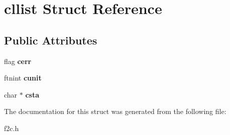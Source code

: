 \hypertarget{structcllist}{
\section{cllist Struct Reference}
\label{structcllist}
}
\subsection*{Public Attributes}
\begin{DoxyCompactItemize}
\item 
\hypertarget{structcllist_afce750ad0c1a89568d816ee4c2c40333}{
flag {\bfseries cerr}}
\label{structcllist_afce750ad0c1a89568d816ee4c2c40333}

\item 
\hypertarget{structcllist_a5ecb27d52d6d1cdccf23f00e6586e4ff}{
ftnint {\bfseries cunit}}
\label{structcllist_a5ecb27d52d6d1cdccf23f00e6586e4ff}

\item 
\hypertarget{structcllist_a8f52d307fd020ad43a2f2e9a2d665103}{
char $\ast$ {\bfseries csta}}
\label{structcllist_a8f52d307fd020ad43a2f2e9a2d665103}

\end{DoxyCompactItemize}


The documentation for this struct was generated from the following file:\begin{DoxyCompactItemize}
\item 
f2c.h\end{DoxyCompactItemize}
